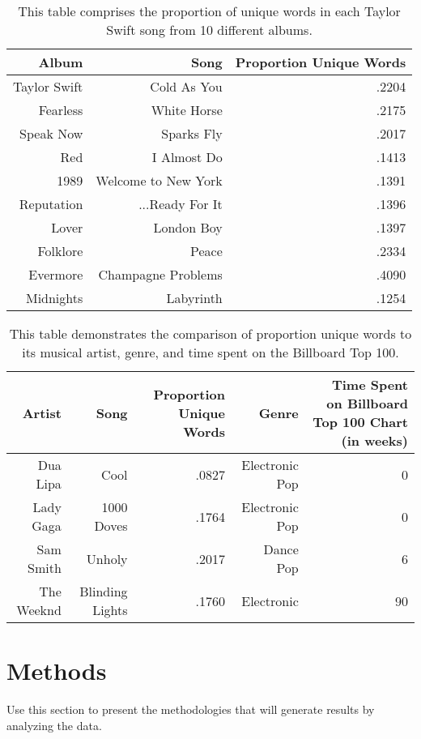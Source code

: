 \documentclass[12pt]{article}
\begin{document}
\begin{table}[tbp]
  \caption{This table comprises the proportion of unique words in each Taylor Swift song from 10 different albums.}
  \label{tab:rv}
\centering
\begin{tabular}{rrr}
  \toprule
Album & Song & Proportion Unique Words \\ 
  \midrule
Taylor Swift & Cold As You & .2204 \\ 
  Fearless & White Horse & .2175 \\ 
  Speak Now & Sparks Fly & .2017 \\ 
  Red & I Almost Do & .1413 \\ 
  1989 & Welcome to New York & .1391 \\ 
  Reputation & ...Ready For It & .1396 \\ 
  Lover & London Boy & .1397 \\ 
  Folklore & Peace & .2334 \\ 
  Evermore & Champagne Problems & .4090 \\ 
  Midnights & Labyrinth & .1254 \\ 
   \bottomrule
\end{tabular}
\end{table}

\begin{table}[tbp]
  \caption{This table demonstrates the comparison of proportion unique words to its musical artist, genre, and time spent on the Billboard Top 100.}
  \label{tab:rv}
\centering
\begin{tabular}{rrrrr}
  \toprule
Artist & Song & Proportion Unique Words & Genre & Time Spent on Billboard Top 100 Chart (in weeks) \\ 
  \midrule
Dua Lipa & Cool & .0827 & Electronic Pop & 0 \\ 
  Lady Gaga & 1000 Doves  & .1764 & Electronic Pop & 0 \\ 
  Sam Smith & Unholy & .2017 & Dance Pop & 6 \\ 
  The Weeknd & Blinding Lights & .1760 & Electronic & 90\\ 
     \bottomrule
\end{tabular}
\end{table}

\section{Methods}
\label{sec:meth}

Use this section to present the methodologies that will generate results by
analyzing the data.
\end{document}
